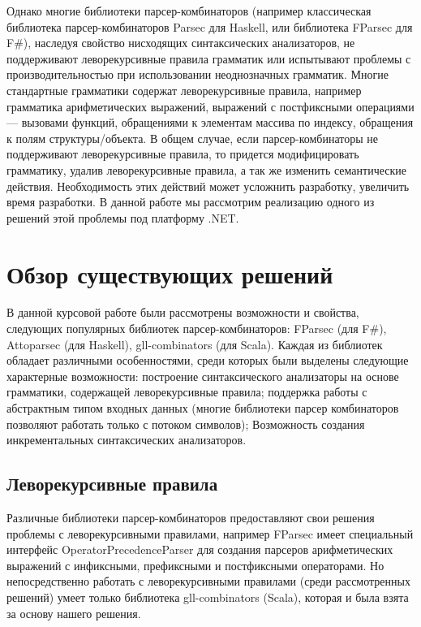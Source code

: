 \documentclass[14pt]{matmex-diploma}
\begin{document}
Однако многие библиотеки парсер-комбинаторов
  (например классическая библиотека парсер-комбинаторов Parsec \cite{LeijenMeijer:parsec} для Haskell, 
  или библиотека FParsec \cite{fparsec} для F\#), 
  наследуя свойство нисходящих синтаксических анализаторов,  
  не поддерживают леворекурсивные правила грамматик 
  или испытывают проблемы с производительностью
  при использовании неоднозначных грамматик. 
  Многие стандартные грамматики содержат леворекурсивные правила, например грамматика арифметических выражений, 
  выражений с постфиксными операциями --- вызовами функций,
  обращениями к элементам массива по индексу, 
обращения к полям структуры/объекта. В общем случае, если парсер-комбинаторы не поддерживают леворекурсивные правила, 
то придется модифицировать грамматику, удалив леворекурсивные правила, 
а так же изменить семантические действия. Необходимость этих действий может усложнить разработку, увеличить время разработки. В данной работе мы рассмотрим реализацию одного из решений этой проблемы под платформу .NET.


\section{Обзор существующих решений}

В данной курсовой работе были рассмотрены возможности и свойства, следующих популярных библиотек парсер-комбинаторов: 
FParsec (для F\#), Attoparsec \cite{attoparsec} (для Haskell), gll-combinators \cite{gllcombinators} (для Scala). Каждая из библиотек обладает различными особенностями, среди которых были выделены следующие характерные возможности: 
построение синтаксического анализаторы на основе грамматики, содержащей леворекурсивные правила; 
  поддержка работы с абстрактным типом входных данных 
  (многие библиотеки парсер комбинаторов позволяют работать только с потоком символов); 
  Возможность создания инкрементальных синтаксических анализаторов.

\subsection{Леворекурсивные правила}

Различные библиотеки парсер-комбинаторов предоставляют свои решения проблемы с леворекурсивными правилами, например FParsec имеет специальный интерфейс OperatorPrecedenceParser для создания парсеров арифметических выражений с инфиксными, префиксными и постфиксными операторами. Но непосредственно работать с леворекурсивными правилами (среди рассмотренных решений) умеет только библиотека gll-combinators (Scala), которая и была взята за основу нашего решения.
\end{document}
